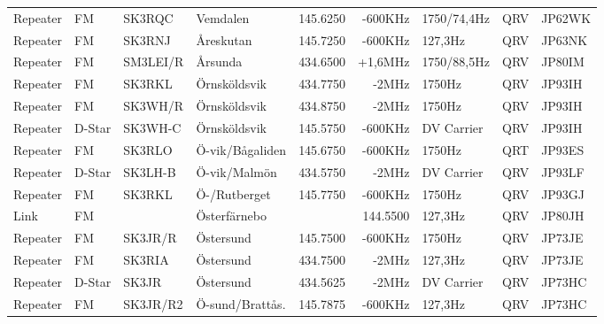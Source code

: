 \begin{landscape}
\begin{longtable}{llllrrlcl}
	Repeater          & FM           & SK3RQC        & Vemdalen         &          145.6250 &        -600KHz & 1750/74,4Hz     &       QRV       & JP62WK           \\
	Repeater          & FM           & SK3RNJ        & Åreskutan        &          145.7250 &        -600KHz & 127,3Hz         &       QRV       & JP63NK           \\
	Repeater          & FM           & SM3LEI/R      & Årsunda          &          434.6500 &        +1,6MHz & 1750/88,5Hz     &       QRV       & JP80IM           \\
	Repeater          & FM           & SK3RKL        & Örnsköldsvik     &          434.7750 &          -2MHz & 1750Hz          &       QRV       & JP93IH           \\
	Repeater          & FM           & SK3WH/R       & Örnsköldsvik     &          434.8750 &          -2MHz & 1750Hz          &       QRV       & JP93IH           \\
	Repeater          & D-Star       & SK3WH-C       & Örnsköldsvik     &          145.5750 &        -600KHz & DV Carrier      &       QRV       & JP93IH           \\
	Repeater          & FM           & SK3RLO        & Ö-vik/Bågaliden  &          145.6750 &        -600KHz & 1750Hz          &       QRT       & JP93ES           \\
	Repeater          & D-Star       & SK3LH-B       & Ö-vik/Malmön     &          434.5750 &          -2MHz & DV Carrier      &       QRV       & JP93LF           \\
	Repeater          & FM           & SK3RKL        & Ö-/Rutberget     &          145.7750 &        -600KHz & 1750Hz          &       QRV       & JP93GJ           \\
	Link              & FM           &               & Österfärnebo     &                   &       144.5500 & 127,3Hz         &       QRV       & JP80JH           \\
	Repeater          & FM           & SK3JR/R       & Östersund        &          145.7500 &        -600KHz & 1750Hz          &       QRV       & JP73JE           \\
	Repeater          & FM           & SK3RIA        & Östersund        &          434.7500 &          -2MHz & 127,3Hz         &       QRV       & JP73JE           \\
	Repeater          & D-Star       & SK3JR         & Östersund        &          434.5625 &          -2MHz & DV Carrier      &       QRV       & JP73HC           \\
	Repeater          & FM           & SK3JR/R2      & Ö-sund/Brattås.  &          145.7875 &        -600KHz & 127,3Hz         &       QRV       & JP73HC
\end{longtable}
\normalsize

\end{landscape}
